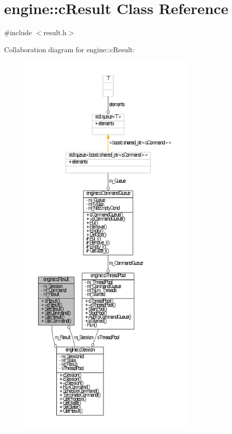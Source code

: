 \hypertarget{classengine_1_1cResult}{\section{engine\-:\-:c\-Result \-Class \-Reference}
\label{classengine_1_1cResult}
}


{\ttfamily \#include $<$result.\-h$>$}



\-Collaboration diagram for engine\-:\-:c\-Result\-:
\nopagebreak
\begin{figure}[H]
\begin{center}
\leavevmode
\includegraphics[height=550pt]{classengine_1_1cResult__coll__graph}
\end{center}
\end{figure}
